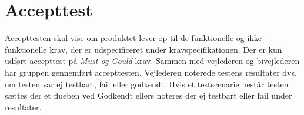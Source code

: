 \pagebreak
\section{Accepttest}
Accepttesten skal vise om produktet lever op til de funktionelle og ikke-funktionelle krav, der er udspecificeret under kravspecifikationen. Der er kun udført accepttest på \textit{Must og Could} krav.  Sammen med vejlederen og bivejlederen har gruppen gennemført accepttesten. Vejlederen noterede testens resultater dvs. om testen var ej testbart, fail eller godkendt. Hvis et testscenarie består testen sættes der et flueben ved Godkendt ellers noteres der ej testbart eller fail under resultater.  